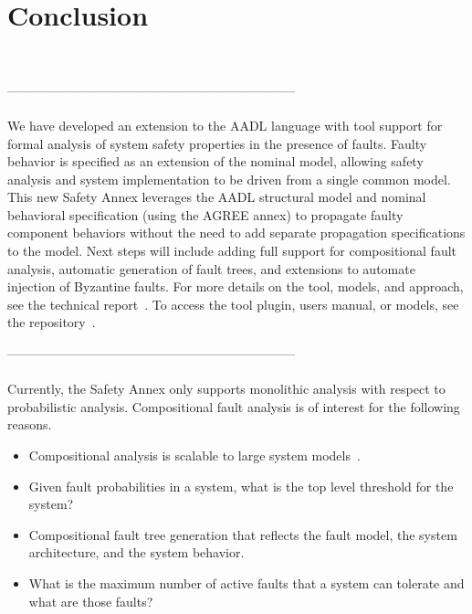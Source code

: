 \section{Conclusion}

\\

--------------------------------------------------------------------\\
\\
We have developed an extension to the AADL language with tool support for formal analysis of system safety properties in the presence of faults. Faulty behavior is specified as an extension of the nominal model, allowing safety analysis and system implementation to be driven from a single common model. This new Safety Annex leverages the AADL structural model and nominal behavioral specification (using the AGREE annex) to propagate faulty component behaviors without the need to add separate propagation specifications to the model. Next steps will include adding full support for compositional fault analysis, automatic generation of fault trees, and extensions to automate injection of Byzantine faults. For more details on the tool, models, and approach, see the technical report~\cite{SATechReport}. To access the tool plugin, users manual, or models, see the repository~\cite{SAGithub}. 

--------------------------------------------------------------------\\
\\
Currently, the Safety Annex only supports monolithic analysis with respect to probabilistic analysis. Compositional fault analysis is of interest for the following reasons. 
\begin{itemize}
\item Compositional analysis is scalable to large system models~\cite{NFM2012:CoGaMiWhLaLu, hilt2013:MuWhRaHe}.
\item Given fault probabilities in a system, what is the top level threshold for the system?
\item Compositional fault tree generation that reflects the fault model, the system architecture, and the system behavior.
\item What is the maximum number of active faults that a system can tolerate and what are those faults?
\end{itemize}

